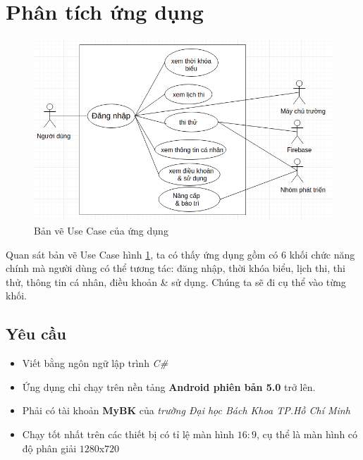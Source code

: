 \documentclass[a4paper]{article}
\begin{document}
\section{Phân tích ứng dụng}
\begin{figure}[htp]
    \centering
    \includegraphics[scale = .35]{usecase.png}
    \caption{Bản vẽ Use Case của ứng dụng}
    \label{fig:usecase}
\end{figure}
Quan sát bản vẽ Use Case hình \ref{fig:usecase}, ta có thấy ứng dụng gồm có 6 khối chức năng chính mà người dùng có thể tương tác: đăng nhập, thời khóa biểu, lịch thi, thi thử, thông tin cá nhân, điều khoản & sử dụng. Chúng ta sẽ đi cụ thể vào từng khối.
\subsection{Yêu cầu}
\begin{itemize}
    \item Viết bằng ngôn ngữ lập trình \textit{C\#}
    \item Ứng dụng chỉ chạy trên nền tảng \textbf{Android phiên bản 5.0} trở lên.
    \item Phải có tài khoản \textbf{MyBK} của \textit{trường Đại học Bách Khoa TP.Hồ Chí Minh}
    \item Chạy tốt nhất trên các thiết bị có tỉ lệ màn hình $16:9$, cụ thể  là màn hình có độ phân giải $1280$x$720$
\end{itemize}
\end{document}
